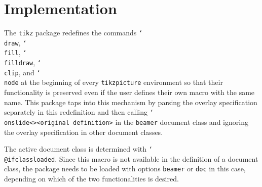 \documentclass{article}
\renewcommand{\textbackslash}{\char`\\}
\def\cmd#1{\texttt{\color{cmd}\textbackslash#1}}
\begin{document}
\section{Implementation}

The \texttt{tikz} package redefines the commands \cmd{draw}, \cmd{fill}, \cmd{filldraw}, \cmd{clip}, and \cmd{node} at the beginning of every \verb|tikzpicture| environment so that their functionality is preserved even if the user defines their own macro with the same name. This package taps into this mechanism by parsing the overlay specification separately in this redefinition and then calling \cmd{onslide<>{<original definition>}} in the \texttt{beamer} document class and ignoring the overlay specification in other document classes.

The active document class is determined with \cmd{@ifclassloaded}. Since this macro is not available in the definition of a document class, the package needs to be loaded with options \texttt{beamer} or \texttt{doc} in this case, depending on which of the two functionalities is desired.
\end{document}
